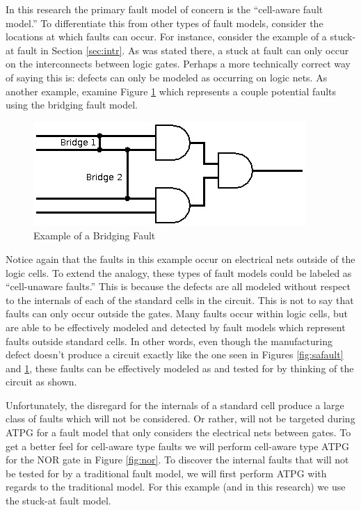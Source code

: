 In this research the primary fault model of concern is the ``cell-aware fault model.''
To differentiate this from other types of fault models, consider the locations at which faults can occur. 
For instance, consider the example of a stuck-at fault in Section \ref{sec:intr}.
As was stated there, a stuck at fault can only occur on the interconnects between logic gates. 
Perhaps a more technically correct way of saying this is: defects can only be modeled as occurring on logic nets. 
As another example, examine Figure \ref{fig:bf} which represents a couple potential faults using the bridging fault model.

\begin{figure}[h!]
\centering
\caption{Example of a Bridging Fault\label{fig:bf}}
\includegraphics[scale=0.5]{Figures/bf.png}
\end{figure}  

Notice again that the faults in this example occur on electrical nets outside of the logic cells. 
To extend the analogy, these types of fault models could be labeled as ``cell-unaware faults.''
This is because the defects are all modeled without respect to the internals of each of the standard cells in the circuit. 
This is not to say that faults can only occur outside the gates.
Many faults occur within logic cells, but are able to be effectively modeled and detected by fault models which represent faults outside standard cells. 
In other words, even though the manufacturing defect doesn't produce a circuit exactly like the one seen in Figures \ref{fig:safault} and \ref{fig:bf}, these faults can be effectively modeled as and tested for by thinking of the circuit as shown. 

Unfortunately, the disregard for the internals of a standard cell produce a large class of faults which will not be considered. 
Or rather, will not be targeted during ATPG for a fault model that only considers the electrical nets between gates.
To get a better feel for cell-aware type faults we will perform cell-aware type ATPG for the NOR gate in Figure \ref{fig:nor}. 
To discover the internal faults that will not be tested for by a traditional fault model, we will first perform ATPG with regards to the traditional model.
For this example (and in this research) we use the stuck-at fault model.


